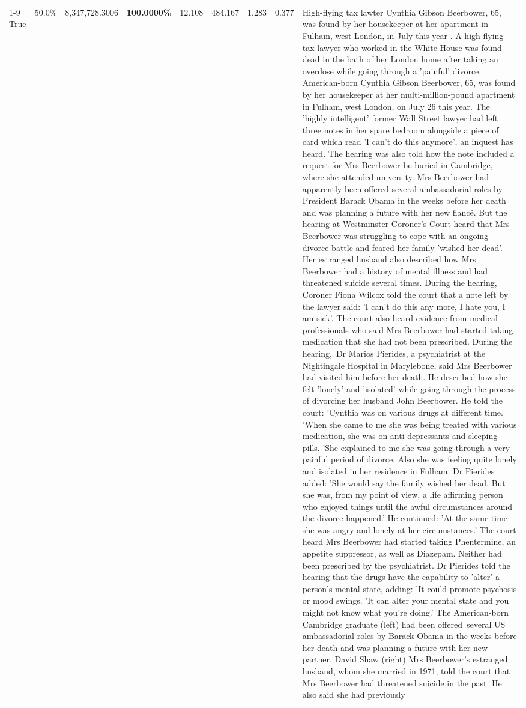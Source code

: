 \begin{table}[H]
\begin{tabular}{lllrlllll}
\cline{1-9}
True & 50.0\% & 8,347,728.3006 & \bfseries \color{red} 100.0000\% & 12.108 & 484.167 & 1,283 & 0.377 & High-flying tax lawter Cynthia Gibson Beerbower, 65, was found by her housekeeper at her apartment in Fulham, west London, in July this year . A high-flying tax lawyer who worked in the White House was found dead in the bath of her London home after taking an overdose while going through a 'painful' divorce. American-born Cynthia Gibson Beerbower, 65, was found by her housekeeper at her multi-million-pound apartment in Fulham, west London, on July 26 this year. The 'highly intelligent' former Wall Street lawyer had left three notes in her spare bedroom alongside a piece of card which read 'I can't do this anymore', an inquest has heard. The hearing was also told how the note included a request for Mrs Beerbower be buried in Cambridge, where she attended university. Mrs Beerbower had apparently been offered several ambassadorial roles by President Barack Obama in the weeks before her death and was planning a future with her new fiancé. But the hearing at Westminster Coroner's Court heard that Mrs Beerbower was struggling to cope with an ongoing divorce battle and feared her family 'wished her dead'. Her estranged husband also described how Mrs Beerbower had a history of mental illness and had threatened suicide several times. During the hearing, Coroner Fiona Wilcox told the court that a note left by the lawyer said: 'I can't do this any more, I hate you, I am sick'. The court also heard evidence from medical professionals who said Mrs Beerbower had started taking medication that she had not been prescribed. During the hearing, Dr Marios Pierides, a psychiatrist at the Nightingale Hospital in Marylebone, said Mrs Beerbower had visited him before her death. He described how she felt 'lonely' and 'isolated' while going through the process of divorcing her husband John Beerbower. He told the court: 'Cynthia was on various drugs at different time. 'When she came to me she was being treated with various medication, she was on anti-depressants and sleeping pills. 'She explained to me she was going through a very painful period of divorce. Also she was feeling quite lonely and isolated in her residence in Fulham. Dr Pierides added: 'She would say the family wished her dead. But she was, from my point of view, a life affirming person who enjoyed things until the awful circumstances around the divorce happened.' He continued: 'At the same time she was angry and lonely at her circumstances.' The court heard Mrs Beerbower had started taking Phentermine, an appetite suppressor, as well as Diazepam. Neither had been prescribed by the psychiatrist. Dr Pierides told the hearing that the drugs have the capability to 'alter' a person's mental state, adding: 'It could promote psychosis or mood swings. 'It can alter your mental state and you might not know what you're doing.' The American-born Cambridge graduate (left) had been offered several US ambassadorial roles by Barack Obama in the weeks before her death and was planning a future with her new partner, David Shaw (right) Mrs Beerbower's estranged husband, whom she married in 1971, told the court that Mrs Beerbower had threatened suicide in the past. He also said she had previously 
\end{tabular}
\end{table}
